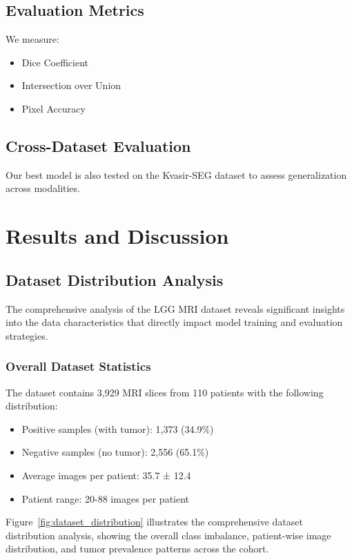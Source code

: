\documentclass[a4paper, journal]{IEEEtran}
\begin{document}
\subsection{Evaluation Metrics}
We measure:
\begin{itemize}
    \item Dice Coefficient
    \item Intersection over Union
    \item Pixel Accuracy
\end{itemize}


\subsection{Cross-Dataset Evaluation}
Our best model is also tested on the Kvasir-SEG dataset to assess generalization across modalities.


\section{Results and Discussion}
\label{sec:results}

\subsection{Dataset Distribution Analysis}

The comprehensive analysis of the LGG MRI dataset reveals significant insights into the data characteristics that directly impact model training and evaluation strategies.

\subsubsection{Overall Dataset Statistics}
The dataset contains 3,929 MRI slices from 110 patients with the following distribution:
\begin{itemize}
    \item Positive samples (with tumor): 1,373 (34.9\%)
    \item Negative samples (no tumor): 2,556 (65.1\%)
    \item Average images per patient: 35.7 ± 12.4
    \item Patient range: 20-88 images per patient
\end{itemize}

Figure~\ref{fig:dataset_distribution} illustrates the comprehensive dataset distribution analysis, showing the overall class imbalance, patient-wise image distribution, and tumor prevalence patterns across the cohort.
\end{document}
